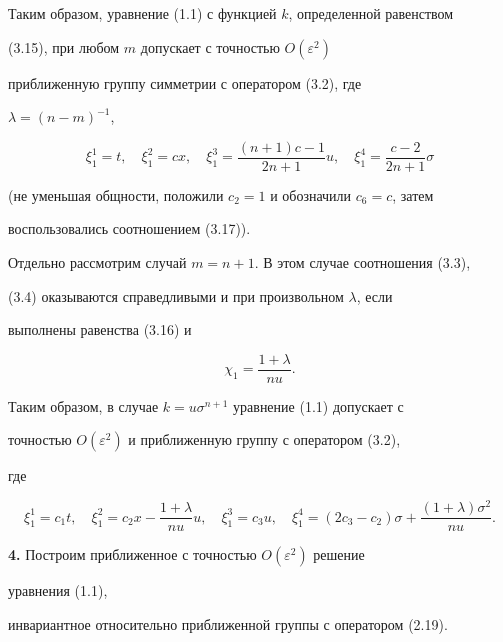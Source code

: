 Таким образом, уравнение (1.1) с функцией $k$, определенной равенством


(3.15), при любом $m$ допускает с точностью $O(\varepsilon^2)$


приближенную группу симметрии с оператором (3.2), где


$\lambda=(n-m)^{-1}$,


\begin{equation}


\xi^1_1=t,\quad \xi^2_1=cx,\quad


\xi^3_1=\frac{(n+1)c-1}{2n+1}u,\quad


\xi^4_1=\frac{c-2}{2n+1}\sigma\tag{3.18}


\end{equation}


(не уменьшая общности, положили $c_2=1$ и обозначили $c_6=c$, затем


воспользовались соотношением (3.17)).





Отдельно рассмотрим случай $m=n+1$. В этом случае соотношения (3.3),


(3.4) оказываются справедливыми и при произвольном $\lambda$, если


выполнены равенства (3.16) и


$$


\chi_1=\frac{1+\lambda}{nu}.


$$





Таким образом, в случае $k=u\sigma^{n+1}$ уравнение (1.1) допускает с


точностью $O(\varepsilon^2)$ и приближенную группу с оператором (3.2),


где


$$


\xi^1_1=c_1t,\quad \xi^2_1=c_2x-\frac{1+\lambda}{nu}u,\quad


\xi^3_1=c_3u,\quad \xi^4_1=(2c_3-c_2)\sigma+


\frac{(1+\lambda)\sigma^2}{nu}.


$$





{\bf 4.} Построим приближенное с точностью $O(\varepsilon^2)$ решение


уравнения (1.1),


инвариантное относительно приближенной группы с оператором (2.19).


